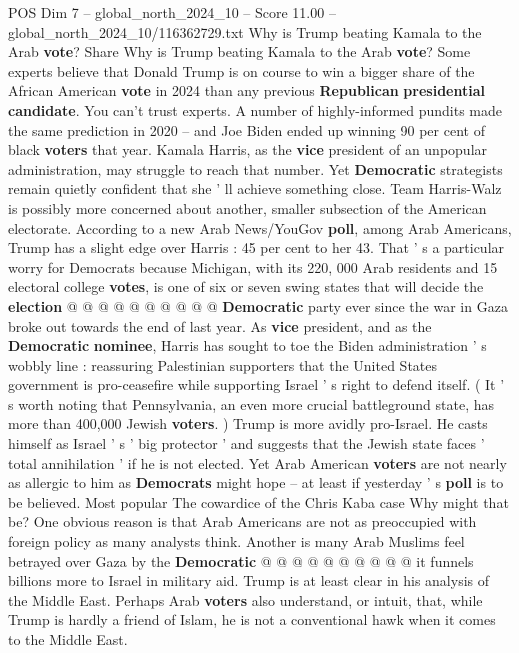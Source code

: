 \begin{textsample}{POS Dim 7 – global\_north\_2024\_10 – Score 11.00 – global\_north\_2024\_10/116362729.txt}  \label{ex:f7_pos_096}
Why is Trump beating Kamala to the Arab \textbf{vote}?
Share Why is Trump beating Kamala to the Arab \textbf{vote}?
Some experts believe that Donald Trump is on course to win a bigger share of the African American \textbf{vote} in 2024 than any previous \textbf{Republican} \textbf{presidential} \textbf{candidate}.
You can't trust experts.
A number of highly-informed pundits made the same prediction in 2020 -- and Joe Biden ended up winning 90 per cent of black \textbf{voters} that year.
Kamala Harris, as the \textbf{vice} president of an unpopular administration, may struggle to reach that number.
Yet \textbf{Democratic} strategists remain quietly confident that she ' ll achieve something close.
Team Harris-Walz is possibly more concerned about another, smaller subsection of the American electorate.
According to a new Arab News/YouGov \textbf{poll}, among Arab Americans, Trump has a slight edge over Harris : 45 per cent to her 43.
That ' s a particular worry for Democrats because Michigan, with its 220, 000 Arab residents and 15 electoral college \textbf{votes}, is one of six or seven swing states that will decide the \textbf{election} @ @ @ @ @ @ @ @ @ @ \textbf{Democratic} party ever since the war in Gaza broke out towards the end of last year.
As \textbf{vice} president, and as the \textbf{Democratic} \textbf{nominee}, Harris has sought to toe the Biden administration ' s wobbly line : reassuring Palestinian supporters that the United States government is pro-ceasefire while supporting Israel ' s right to defend itself. ( It ' s worth noting that Pennsylvania, an even more crucial battleground state, has more than 400,000 Jewish \textbf{voters}. ) Trump is more avidly pro-Israel.
He casts himself as Israel ' s ' big protector ' and suggests that the Jewish state faces ' total annihilation ' if he is not elected.
Yet Arab American \textbf{voters} are not nearly as allergic to him as \textbf{Democrats} might hope -- at least if yesterday ' s \textbf{poll} is to be believed.
Most popular The cowardice of the Chris Kaba case Why might that be?
One obvious reason is that Arab Americans are not as preoccupied with foreign policy as many analysts think.
Another is many Arab Muslims feel betrayed over Gaza by the \textbf{Democratic} @ @ @ @ @ @ @ @ @ @ it funnels billions more to Israel in military aid.
Trump is at least clear in his analysis of the Middle East.
Perhaps Arab \textbf{voters} also understand, or intuit, that, while Trump is hardly a friend of Islam, he is not a conventional hawk when it comes to the Middle East.

\end{textsample}
